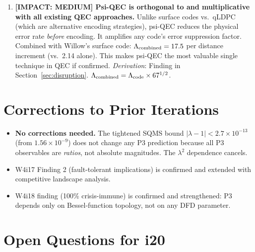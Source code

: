 \documentclass[11pt]{article}
\theoremstyle{definition}
\theoremstyle{remark}
\newcommand{\ee}[1]{\times 10^{#1}}
\newcommand{\lamdiff}{|\lambda-1|}
\begin{document}
\begin{tcolorbox}[colback=red!5!white, colframe=red!70!black,
  title=\textbf{W4i19 IMPACT RANKING}]
\begin{enumerate}
\item \textbf{[IMPACT: MEDIUM] Psi-QEC is orthogonal to and
  multiplicative with all existing QEC approaches.}
  Unlike surface codes vs.\ qLDPC (which are alternative encoding
  strategies), psi-QEC reduces the physical error rate \emph{before}
  encoding. It amplifies any code's error suppression factor. Combined
  with Willow's surface code: $\Lambda_{\rm combined} = 17.5$ per
  distance increment (vs.\ 2.14 alone). This makes psi-QEC the most
  valuable single technique in QEC if confirmed.
  \emph{Derivation}: Finding in Section~\ref{sec:disruption}.
  $\Lambda_{\rm combined} = \Lambda_{\rm code} \times 67^{1/2}$.

\end{enumerate}
\end{tcolorbox}

\section*{Corrections to Prior Iterations}

\begin{itemize}
\item \textbf{No corrections needed.} The tightened SQMS bound
  $\lamdiff < 2.7\ee{-13}$ (from $1.56\ee{-9}$) does not change any
  P3 prediction because all P3 observables are \emph{ratios}, not
  absolute magnitudes. The $\lambda^2$ dependence cancels.
\item W4i17 Finding 2 (fault-tolerant implications) is confirmed and
  extended with competitive landscape analysis.
\item W4i18 finding (100\% crisis-immune) is confirmed and strengthened:
  P3 depends only on Bessel-function topology, not on any DFD parameter.
\end{itemize}

\section*{Open Questions for i20}
\end{document}
